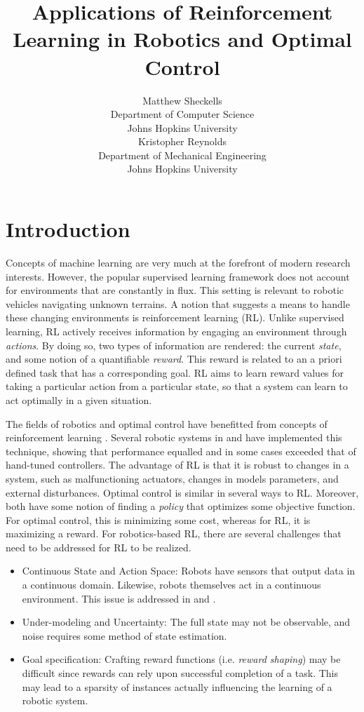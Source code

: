 \documentclass{article} %
\title{Applications of Reinforcement Learning in Robotics and Optimal Control}%
\author{
Matthew Sheckells\\
Department of Computer Science\\
Johns Hopkins University\\
\And
Kristopher Reynolds \\
Department of Mechanical Engineering\\
Johns Hopkins University\\
}
\begin{document}
\maketitle

\section{Introduction}
Concepts of machine learning are very much at the forefront of modern research interests. However, the popular supervised learning framework does not account for environments that are constantly in flux. This setting is relevant to robotic vehicles navigating unknown terrains. A notion that suggests a means to handle these changing environments is reinforcement learning (RL). Unlike supervised learning, RL actively receives information by engaging an environment through \textit{actions}. By doing so, two types of information are rendered: the current \textit{state}, and some notion of a quantifiable \textit{reward}. This reward is related to an a priori defined task that has a corresponding goal. RL aims to learn reward values for taking a particular action from a particular state, so that a system can learn to act optimally in a given situation.

The fields of robotics and optimal control have benefitted from concepts of reinforcement learning \cite{kober_reinforcement_2013}\cite{kaelbling_reinforcement_1996}. Several robotic systems in  \cite{bhasin_reinforcement_2011} and \cite{hester_rtmba:_2012} have implemented this technique, showing that performance equalled and in some cases exceeded that of hand-tuned controllers. The advantage of RL is that it is robust to changes in a system, such as malfunctioning actuators, changes in models parameters, and external disturbances. Optimal control is similar in several ways to RL. Moreover, both have some notion of finding a \textit{policy} that optimizes some objective function. For optimal control, this is minimizing some cost, whereas for RL, it is maximizing a reward. For robotics-based RL, there are several challenges that need to be addressed for RL to be realized.
\begin{itemize}
\item Continuous State and Action Space: Robots have sensors that output data in a continuous domain.  Likewise, robots themselves act in a continuous environment. This issue is addressed in \cite{gaskett_thesis} and \cite{q_learning_navigation}.
\item Under-modeling and Uncertainty: The full state may not be observable, and noise requires some method of state estimation.
\item Goal specification: Crafting reward functions (i.e. \textit{reward shaping}) may be difficult since rewards can rely upon successful completion of a task. This may lead to a sparsity of instances actually influencing the learning of a robotic system.
\end{itemize}
\end{document}
